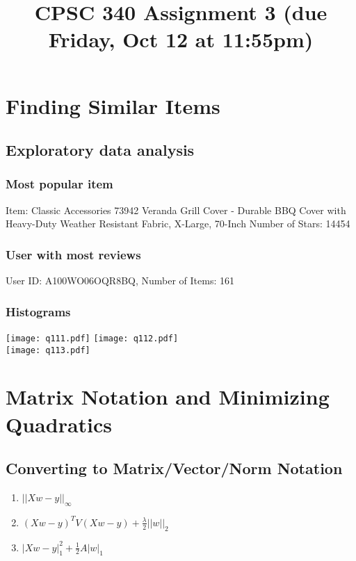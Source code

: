 \documentclass{article}
\begin{document}
    
\title{CPSC 340 Assignment 3 (due Friday, Oct 12 at 11:55pm)}
\date{}
\maketitle
    
\vspace{-7em}

\section{Finding Similar Items}
\subsection{Exploratory data analysis}

\subsubsection{Most popular item}
Item: Classic Accessories 73942 Veranda Grill Cover - Durable BBQ Cover with Heavy-Duty Weather Resistant Fabric, X-Large, 70-Inch
Number of Stars: 14454

\subsubsection{User with most reviews}
User ID: A100WO06OQR8BQ, Number of Items: 161

\subsubsection{Histograms}
\texttt{[image: q111.pdf]}
\texttt{[image: q112.pdf]}\\

\texttt{[image: q113.pdf]}

\section{Matrix Notation and Minimizing Quadratics}
\subsection{Converting to Matrix/Vector/Norm Notation}
\begin{enumerate}
    \item $||Xw - y||_{\infty}$
    \item $(Xw-y)^TV(Xw-y)+\frac{\lambda}{2}||w||_2$
    \item $|Xw-y|^2_1+\frac{1}{2}A|w|_1$
\end{enumerate}
\end{document}
